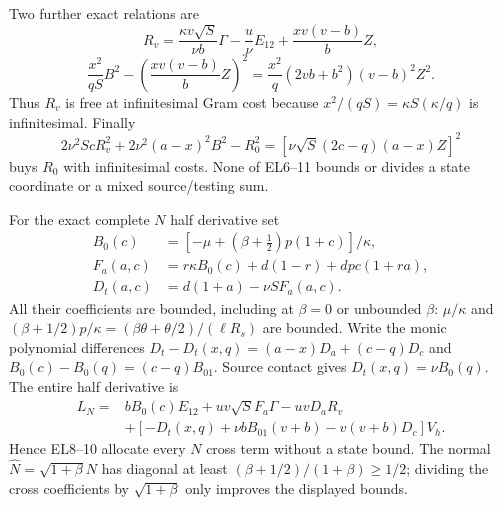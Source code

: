 Two further exact relations are
\[
 R_v=\frac{\kappa v\sqrt S}{\nu b}\Gamma
       -\frac u\nu E_{12}+\frac{xv(v-b)}bZ,          \tag{EL9}
\]
\[
 \frac{x^2}{qS}B^2-
       \left(\frac{xv(v-b)}bZ\right)^2
   =\frac{x^2}{q}(2vb+b^2)(v-b)^2Z^2.              \tag{EL10}
\]
Thus $R_v$ is free at infinitesimal Gram cost because
$x^2/(qS)=\kappa S(\kappa/q)$ is infinitesimal.  Finally
\[
 2\nu^2ScR_v^2+2\nu^2(a-x)^2B^2-R_0^2
       =[\nu\sqrt S(2c-q)(a-x)Z]^2               \tag{EL11}
\]
buys $R_0$ with infinitesimal costs.  None of EL6--11 bounds or
divides a state coordinate or a mixed source/testing sum.

For the exact complete $N$ half derivative set
\[
\begin{aligned}
 B_0(c)&=[-\mu+(\beta+\tfrac12)p(1+c)]/\kappa,\\
 F_a(a,c)&=r\kappa B_0(c)+d(1-r)+dpc(1+ra),\\
 D_t(a,c)&=d(1+a)-\nu S F_a(a,c).
\end{aligned}                                                     \tag{EL12}
\]
All their coefficients are bounded, including at $\beta=0$ or
unbounded $\beta$: $\mu/\kappa$ and
$(\beta+1/2)p/\kappa=(\beta\theta+\theta/2)/(\ell R_s)$
are bounded.  Write the monic polynomial differences
$D_t-D_t(x,q)=(a-x)D_a+(c-q)D_c$ and
$B_0(c)-B_0(q)=(c-q)B_{01}$.  Source contact gives
$D_t(x,q)=\nu B_0(q)$.  The entire half derivative is
\[
\begin{aligned}
 L_N={}&bB_0(c)E_{12}+uv\sqrt S F_a\Gamma-uvD_aR_v\\
 &+[-D_t(x,q)+\nu bB_{01}(v+b)-v(v+b)D_c]V_h.
\end{aligned}                                                     \tag{EL13}
\]
Hence EL8--10 allocate every $N$ cross term without a state bound.
The normal $\widehat N=\sqrt{1+\beta}N$ has diagonal at least
$(\beta+1/2)/(1+\beta)\ge1/2$; dividing the cross coefficients
by $\sqrt{1+\beta}$ only improves the displayed bounds.

